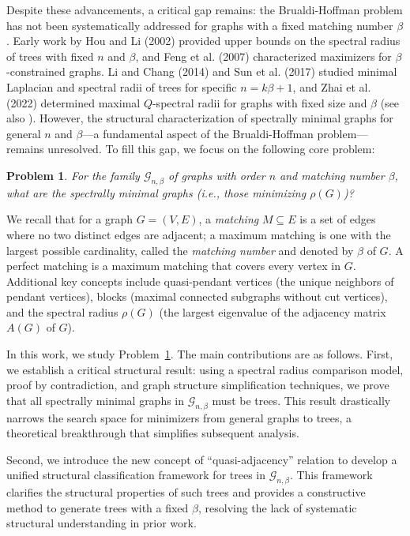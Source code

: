 \documentclass[12pt]{amsart}
\newtheorem{prob}{Problem}
\begin{document}
Despite these advancements, a critical gap remains: the Brualdi-Hoffman problem has not been systematically addressed for graphs with a fixed matching number \( \beta \). Early work by Hou and Li (2002) \cite{HouLi2002} provided upper bounds on the spectral radius of trees with fixed \( n \) and \( \beta \), and Feng et al. (2007) \cite{FengYu2007} characterized maximizers for \( \beta \)-constrained graphs. Li and Chang (2014) \cite{LiChang2014} and Sun et al. (2017) \cite{Sun2017} studied minimal Laplacian and spectral radii of trees for specific \( n = k\beta + 1 \), and Zhai et al. (2022) \cite{ZhaiXue2022} determined maximal \( Q \)-spectral radii for graphs with fixed size and \( \beta \) (see also \cite{Chang2003, Cioaba2005, LinGuo2007}). However, the structural characterization of spectrally minimal graphs for general \( n \) and \( \beta \)—a fundamental aspect of the Brualdi-Hoffman problem—remains unresolved. To fill this gap, we focus on the following core problem:

\begin{prob}\label{p2}
For the family \( \mathcal{G}_{n,\beta} \) of graphs with order \( n \) and matching number \( \beta \), what are the spectrally minimal graphs (i.e., those minimizing \( \rho(G) \))?
\end{prob}

We recall that for a graph \( G = (V, E) \), a \emph{matching} \( M \subseteq E \) is a set of edges where no two distinct edges are adjacent; a maximum matching is one with the largest possible cardinality, called the \emph{matching number} and denoted by \( \beta \) of \( G \). A perfect matching is a maximum matching that covers every vertex in \( G \). Additional key concepts include quasi-pendant vertices (the unique neighbors of pendant vertices), blocks (maximal connected subgraphs without cut vertices), and the spectral radius \( \rho(G) \) (the largest eigenvalue of the adjacency matrix \( A(G) \) of \( G \)).


In this work, we study Problem~\ref{p2}. The  main contributions are as follows. First, we establish a critical structural result: using a spectral radius comparison model, proof by contradiction, and graph structure simplification techniques, we prove that all spectrally minimal graphs in \( \mathcal{G}_{n,\beta} \) must be trees. This result drastically narrows the search space for minimizers from general graphs to trees, a theoretical breakthrough that simplifies subsequent analysis.

Second, we introduce the new concept of ``quasi-adjacency'' relation to develop a unified structural classification framework for trees in \( \mathcal{G}_{n,\beta} \). This framework clarifies the structural properties of such trees and provides a constructive method to generate trees with a fixed \( \beta \), resolving the lack of systematic structural understanding in prior work.
\end{document}

